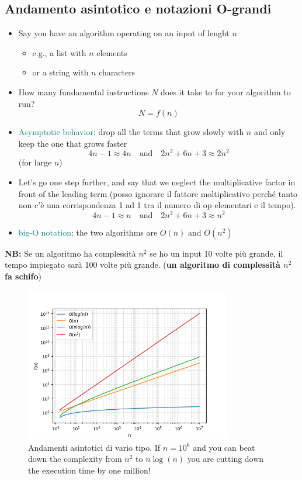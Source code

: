 \subsection{Andamento asintotico e notazioni O-grandi}

\begin{itemize}
  \item Say you have an algorithm operating on an input of lenght $n$
    \begin{itemize}
    \item e.g., a list with $n$ elements
    \item or a string with $n$ characters 
    \end{itemize}
  \item How many fundamental instructions $N$ does it take to for your algorithm
    to run?
    $$
    N = f(n)
    $$
  \item \textcolor{teal}{Asymptotic behavior}: drop all the terms that grow slowly with
    $n$ and only keep the one that grows faster
    $$
    4n - 1 \approx 4n \quad\text{and}\quad 2n^2 + 6n + 3 \approx 2n^2
    $$
    (for large $n$)
  \item Let's go one step further, and say that we neglect the multiplicative
    factor in front of the leading term (posso ignorare il fattore moltiplicativo perché tanto non c'è una corrispondenza 1 ad 1 tra il numero di op elementari e il tempo).
    $$
    4n - 1 \approx n \quad\text{and}\quad 2n^2 + 6n + 3 \approx n^2
    $$
  \item \textcolor{teal}{big-O notation}: the two algorithms are $O(n)$ and $O(n^2)$
  \end{itemize}



\textbf{NB:} Se un algoritmo ha complessità $n^2$
se ho un input 10 volte più grande, il tempo impiegato sarà 100 volte più grande. (\textbf{un algoritmo di complessità $n^2$ fa schifo})


\begin{figure}[ht]
    \centering
    \includegraphics[width=0.8\textwidth]{lez3/asymptotic_behavior.png}
    \caption{Andamenti asintotici di vario tipo. If $n = 10^6$ and you can beat down the complexity from $n^2$ to $n\log(n)$ you are cutting down the execution time by one million!}
    \label{asympt}
\end{figure}
\FloatBarrier

